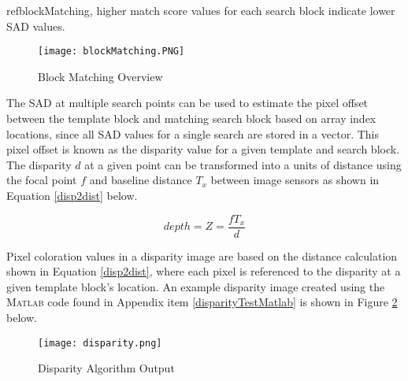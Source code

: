 ref{blockMatching}, higher match score values for each search block indicate lower SAD values.
\par
\begin{figure}[H]
	\centerline{\texttt{[image: blockMatching.PNG]}}
	\caption{Block Matching Overview \cite{collins}}
	\label{blockMatching}
\end{figure}
\par
The SAD at multiple search points can be used to estimate the pixel offset between the template block and matching search block based on array index locations, since all SAD values for a single search are stored in a vector. This pixel offset is known as the disparity value for a given template and search block. The disparity $d$ at a given point can be transformed into a units of distance using the focal point $f$ and baseline distance $T_x$ between image sensors as shown in Equation \ref{disp2dist} below. 
\par
\begin{equation}\label{disp2dist}
depth = Z = \frac{fT_x}{d}
\end{equation}
\par
Pixel coloration values in a disparity image are based on the distance calculation shown in Equation \ref{disp2dist}, where each pixel is referenced to the disparity at a given template block's location. An example disparity image created using the \textsc{Matlab} code found in Appendix item \ref{disparityTestMatlab} is shown in Figure \ref{disparityOutput} below. 
\par
\begin{figure}[H]
	\centerline{\texttt{[image: disparity.png]}}
	\caption{Disparity Algorithm Output}
	\label{disparityOutput}
\end{figure}

